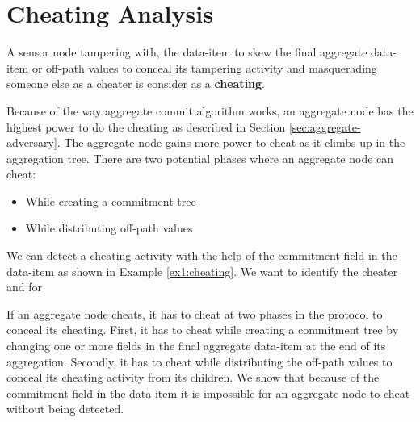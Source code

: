 \chapter{Cheating Analysis}
	
	\begin{definition}
		A sensor node tampering with, the data-item to skew the final aggregate data-item or  off-path values to conceal its tampering activity and masquerading someone else as a cheater is consider as a \textbf{cheating}.	
	\end{definition}
	Because of the way aggregate commit algorithm works, an aggregate node has the highest power to do the cheating as described in Section \ref{sec:aggregate-adversary}. 
	The aggregate node gains more power to cheat as it climbs up in the aggregation tree.
	There are two potential phases where an aggregate node can cheat:
	\begin{itemize}
		\item While creating a commitment tree
		\item While distributing off-path values
	\end{itemize}
	We can detect a cheating activity with the help of the commitment field in the data-item as shown in Example \ref{ex1:cheating}.
	We want to identify the cheater and for 

	If an aggregate node cheats, it has to cheat at two phases in the protocol to conceal its cheating.
	First, it has to cheat while creating a commitment tree by changing one or more fields in the final aggregate data-item at the end of its aggregation.
	Secondly, it has to cheat while distributing the off-path values to conceal its cheating activity from its children.
	We show that because of the commitment field in the data-item it is impossible for an aggregate node to cheat without being detected.
